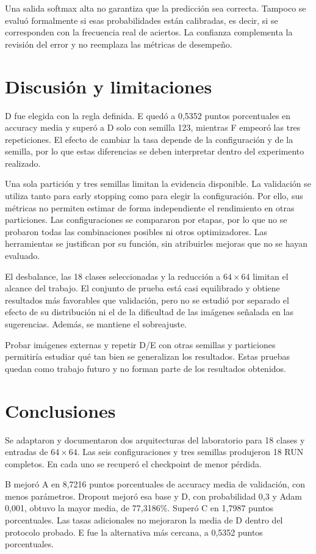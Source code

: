 \documentclass[11pt,letterpaper]{article}
\begin{document}
Una salida softmax alta no garantiza que la predicción sea correcta. Tampoco se evaluó formalmente si esas probabilidades están calibradas, es decir, si se corresponden con la frecuencia real de aciertos. La confianza complementa la revisión del error y no reemplaza las métricas de desempeño.
\FloatBarrier

\section{Discusión y limitaciones}
D fue elegida con la regla definida. E quedó a 0,5352 puntos porcentuales en accuracy media y superó a D solo con semilla 123, mientras F empeoró las tres repeticiones. El efecto de cambiar la tasa depende de la configuración y de la semilla, por lo que estas diferencias se deben interpretar dentro del experimento realizado.

Una sola partición y tres semillas limitan la evidencia disponible. La validación se utiliza tanto para early stopping como para elegir la configuración. Por ello, sus métricas no permiten estimar de forma independiente el rendimiento en otras particiones. Las configuraciones se compararon por etapas, por lo que no se probaron todas las combinaciones posibles ni otros optimizadores. Las herramientas se justifican por su función, sin atribuirles mejoras que no se hayan evaluado.

El desbalance, las 18 clases seleccionadas y la reducción a $64\times64$ limitan el alcance del trabajo. El conjunto de prueba está casi equilibrado y obtiene resultados más favorables que validación, pero no se estudió por separado el efecto de su distribución ni el de la dificultad de las imágenes señalada en las sugerencias. Además, se mantiene el sobreajuste.

Probar imágenes externas y repetir D/E con otras semillas y particiones permitiría estudiar qué tan bien se generalizan los resultados. Estas pruebas quedan como trabajo futuro y no forman parte de los resultados obtenidos.

\section{Conclusiones}
Se adaptaron y documentaron dos arquitecturas del laboratorio para 18 clases y entradas de $64\times64$. Las seis configuraciones y tres semillas produjeron 18 RUN completos. En cada uno se recuperó el checkpoint de menor pérdida.

B mejoró A en 8,7216 puntos porcentuales de accuracy media de validación, con menos parámetros. Dropout mejoró esa base y D, con probabilidad 0,3 y Adam 0,001, obtuvo la mayor media, de 77,3186\%. Superó C en 1,7987 puntos porcentuales. Las tasas adicionales no mejoraron la media de D dentro del protocolo probado. E fue la alternativa más cercana, a 0,5352 puntos porcentuales.
\end{document}
